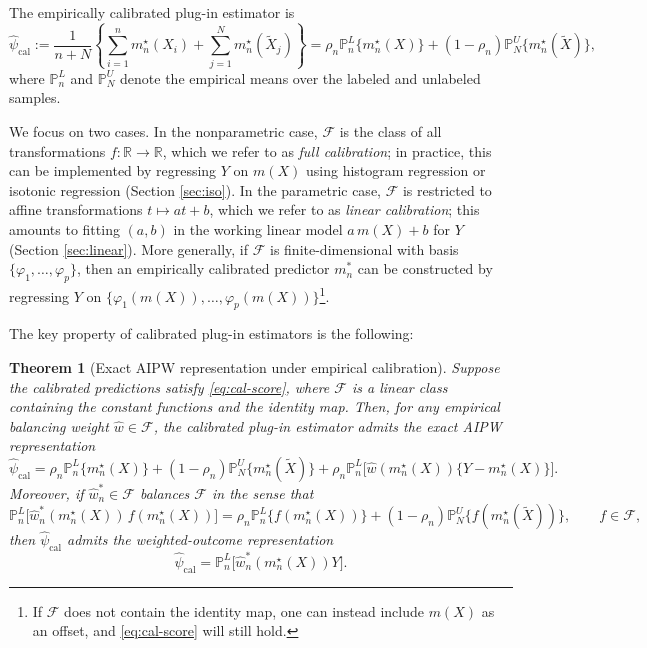 \documentclass{article}
\theoremstyle{plain}
\newtheorem{theorem}{Theorem}
\theoremstyle{definition}
\newcommand{\R}{\mathbb{R}}
\newcommand{\1}{\mathbbm{1}}
\newcommand{\psihat}{\widehat{\psi}_{\mathrm{cal}}}
\newcommand{\what}{\widehat w}
\newcommand{\rhon}{\rho_n}
\newcommand{\mtilde}{m_n^\star}
\newcommand{\Pl}{\mathbb{P}^{L}_n}
\newcommand{\Pu}{\mathbb{P}^{U}_N}
\begin{document}
The empirically calibrated plug-in estimator is
\begin{equation}
\label{eq:plugin}
\psihat
:=
\frac{1}{n+N}\left\{\sum_{i=1}^n \mtilde(X_i) + \sum_{j=1}^N \mtilde(\widetilde X_j)\right\}
=
\rhon \Pl\{\mtilde(X)\}+(1-\rhon)\Pu\{\mtilde(\widetilde X)\},
\end{equation}
where \(\Pl\) and \(\Pu\) denote the empirical means over the labeled and unlabeled samples. 


We focus on two cases. In the nonparametric case, \(\mathcal F\) is the class of all transformations \(f:\R\to\R\), which we refer to as \emph{full calibration}; in practice, this can be implemented by regressing \(Y\) on \(m(X)\) using histogram regression or isotonic regression (Section \ref{sec:iso}). In the parametric case, \(\mathcal F\) is restricted to affine transformations \(t\mapsto at+b\), which we refer to as \emph{linear calibration}; this amounts to fitting \((a,b)\) in the working linear model \(a\,m(X)+b\) for \(Y\) (Section \ref{sec:linear}). More generally, if \(\mathcal F\) is finite-dimensional with basis \(\{\varphi_1,\dots,\varphi_p\}\), then an empirically calibrated predictor \(m_n^*\) can be constructed by regressing \(Y\) on \(\{\varphi_1(m(X)),\dots,\varphi_p(m(X))\}\)\footnote{If \(\mathcal F\) does not contain the identity map, one can instead include \(m(X)\) as an offset, and \eqref{eq:cal-score} will still hold.}.

The key property of calibrated plug-in estimators is the following:
 

\begin{theorem}[Exact AIPW representation under empirical calibration]
\label{thm:repr}
Suppose the calibrated predictions satisfy \cref{eq:cal-score}, where \(\mathcal F\) is a linear class containing the constant functions and the identity map. Then, for any empirical balancing weight \(\what\in\mathcal F\), the calibrated plug-in estimator admits the exact AIPW representation
\begin{equation}
\label{eq:abw-general}
\psihat
=
\rhon \Pl\{\mtilde(X)\}+(1-\rhon)\Pu\{\mtilde(\widetilde X)\}
+
\rhon \Pl\bigl[\what(\mtilde(X))\{Y-\mtilde(X)\}\bigr].
\end{equation}
Moreover, if \(\what_n^*\in\mathcal F\) balances \(\mathcal F\) in the sense that
\begin{equation}
\label{eq:F-balance}
\Pl\bigl[\what_n^*(\mtilde(X))\,f(\mtilde(X))\bigr]
=
\rhon \Pl\{f(\mtilde(X))\}
+
(1-\rhon)\Pu\{f(\mtilde(\widetilde X))\},
\qquad
f\in\mathcal F,
\end{equation}
then \(\psihat\) admits the weighted-outcome representation
\begin{equation}
\label{eq:abw-general-balance}
\psihat
=
\Pl\bigl[\what_n^*(\mtilde(X))Y\bigr].
\end{equation}
\end{theorem}
\end{document}
